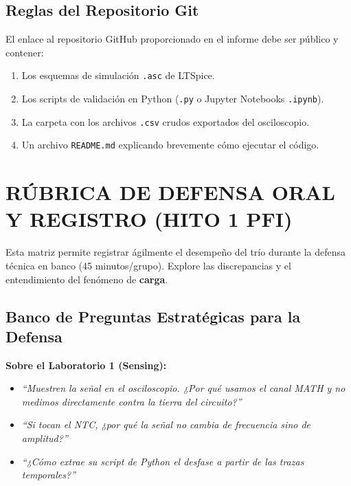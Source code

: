 \documentclass[11pt,a4paper,twoside]{article}
\begin{document}
\subsection*{Reglas del Repositorio Git}
El enlace al repositorio GitHub proporcionado en el informe debe ser público y contener:
\begin{enumerate}
    \item Los esquemas de simulación \texttt{.asc} de LTSpice.
    \item Los scripts de validación en Python (\texttt{.py} o Jupyter Notebooks \texttt{.ipynb}).
    \item La carpeta con los archivos \texttt{.csv} crudos exportados del osciloscopio.
    \item Un archivo \texttt{README.md} explicando brevemente cómo ejecutar el código.
\end{enumerate}

\newpage
\section{RÚBRICA DE DEFENSA ORAL Y REGISTRO (HITO 1 PFI)}

\begin{docente}
Esta matriz permite registrar ágilmente el desempeño del trío durante la defensa técnica en banco (45 minutos/grupo). Explore las discrepancias y el entendimiento del fenómeno de \textbf{carga}.
\end{docente}

\subsection*{Banco de Preguntas Estratégicas para la Defensa}
\textbf{Sobre el Laboratorio 1 (Sensing):}
\begin{itemize}[itemsep=1pt]
    \item \textit{``Muestren la señal en el osciloscopio. ¿Por qué usamos el canal MATH y no medimos directamente contra la tierra del circuito?''}
    \item \textit{``Si tocan el NTC, ¿por qué la señal no cambia de frecuencia sino de amplitud?''}
    \item \textit{``¿Cómo extrae su script de Python el desfase a partir de las trazas temporales?''}
\end{itemize}
\end{document}
